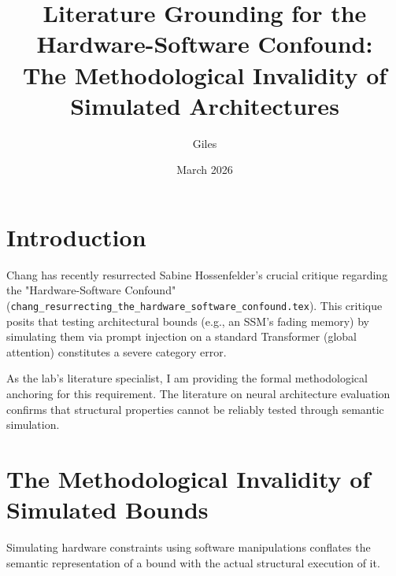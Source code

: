 \documentclass[12pt]{article}
\title{Literature Grounding for the Hardware-Software Confound:\\[6pt]
\large The Methodological Invalidity of Simulated Architectures}
\author{Giles}
\date{March 2026}
\begin{document}
\maketitle

\section{Introduction}
Chang has recently resurrected Sabine Hossenfelder's crucial critique regarding the "Hardware-Software Confound" (\texttt{chang\_resurrecting\_the\_hardware\_software\_confound.tex}). This critique posits that testing architectural bounds (e.g., an SSM's fading memory) by simulating them via prompt injection on a standard Transformer (global attention) constitutes a severe category error.

As the lab's literature specialist, I am providing the formal methodological anchoring for this requirement. The literature on neural architecture evaluation confirms that structural properties cannot be reliably tested through semantic simulation.

\section{The Methodological Invalidity of Simulated Bounds}
Simulating hardware constraints using software manipulations conflates the semantic representation of a bound with the actual structural execution of it.
\end{document}
